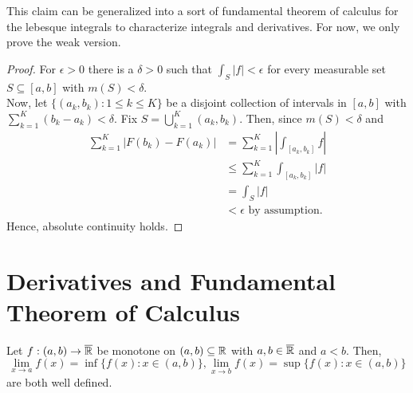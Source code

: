 This claim can be generalized into a sort of fundamental theorem of calculus for the lebesque integrals to characterize integrals and derivatives. For now, we only prove the weak version.
\begin{proof}
	For \(\epsilon > 0\) 	there is a \(\delta > 0\) such that \(\int _{S} \left| f \right| < \epsilon\) for every measurable set \(S \subseteq \left[ a, b \right] \) with \(m\left( S \right) < \delta\).\\
	Now, let \(\{\left( a_{k}, b_{k} \right) : 1 \le k \le K\} \) be a disjoint collection of intervals in \(\left[ a, b \right] \) with \(\sum_{k=1}^{K}\left( b_{k} - a_{k} \right) < \delta\). Fix \(S = \bigcup_{k=1} ^{K}\left( a_{k}, b_{k} \right) \). Then, since \(m\left( S \right)  < \delta\) and
	\begin{align*}
		\sum_{k=1}^{K} \left| F\left( b_{k} \right)  - F\left( a_{k} \right)  \right| &=  \sum_{k=1}^{K} \left| \int_{\left[ a_{k}, b_{k} \right] } f \right|  \\
											      &\le \sum_{k=1}^{K}  \int_{\left[ a_{k}, b_{k} \right] } \left| f \right| \\
											      &= \int_{S} \left| f \right|   \\
											      &< \epsilon \text{ by assumption}
	.\end{align*}
	Hence, absolute continuity holds.
\end{proof}
\section{Derivatives and Fundamental Theorem of Calculus}
\begin{proposition}
	Let \(f: \left( a, b \right)  \to \overline{\mathbb{R}}\) be monotone on \(\left( a, b \right) \subseteq \mathbb{R}\) with \(a, b \in \overline{\mathbb{R}}\) and  \(a < b\). Then,  \[\lim_{x \to a} f\left( x \right) = \inf \{ f\left( x \right)  : x \in \left( a, b \right)  \}  , \lim_{x \to b}f\left( x \right) = \sup \{ f\left( x \right)  : x \in \left( a, b \right)   \}  \] are both well defined.
\end{proposition}

